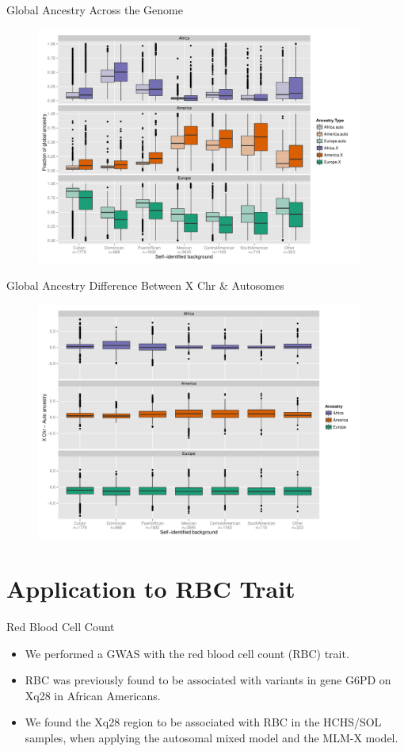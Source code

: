 \documentclass{beamer}
\begin{document}
\begin{frame}{Global Ancestry Across the Genome}
\begin{figure}
\centering
\includegraphics[height=7.8cm]{../admixture_xchrAutoComp_k3_boxplots.pdf}
\end{figure}
\end{frame}

\begin{frame}{Global Ancestry Difference Between X Chr \& Autosomes}
\begin{figure}
\centering
\includegraphics[height=7.8cm]{../admixture_xchrAutoDiff_k3_boxplots.pdf}
\end{figure}
\end{frame}


\section{Application to RBC Trait}

\begin{frame}{Red Blood Cell Count}
\begin{itemize}
\item We performed a GWAS with the red blood cell count (RBC) trait. 
\item RBC was previously found to be associated with variants in gene G6PD on Xq28 in African Americans.
\item We found the Xq28 region to be associated with RBC in the HCHS/SOL samples, when applying the autosomal mixed model and the MLM-X model.
\end{itemize}
\end{frame}
\end{document}
